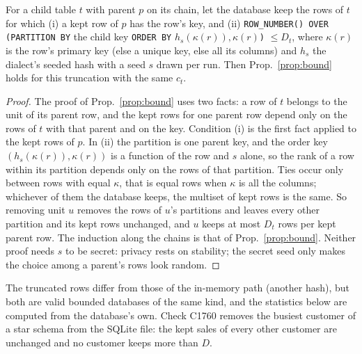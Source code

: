 \setcounter{proposition}{1759}
\begin{proposition}\label{prop:sqlbound}
For a child table $t$ with parent $p$ on its chain, let the database keep the rows of $t$ for which (i) a kept row of $p$ has the row's key, and (ii) \texttt{ROW\_NUMBER() OVER (PARTITION BY} the child key \texttt{ORDER BY} $h_s(\kappa(r)),\kappa(r)$\texttt{)} $\le D_t$, where $\kappa(r)$ is the row's primary key (else a unique key, else all its columns) and $h_s$ the dialect's seeded hash with a seed $s$ drawn per run. Then Prop.~\ref{prop:bound} holds for this truncation with the same $c_t$.
\end{proposition}
\begin{proof}
The proof of Prop.~\ref{prop:bound} uses two facts: a row of $t$ belongs to the unit of its parent row, and the kept rows for one parent row depend only on the rows of $t$ with that parent and on the key. Condition (i) is the first fact applied to the kept rows of $p$. In (ii) the partition is one parent key, and the order key $(h_s(\kappa(r)),\kappa(r))$ is a function of the row and $s$ alone, so the rank of a row within its partition depends only on the rows of that partition. Ties occur only between rows with equal $\kappa$, that is equal rows when $\kappa$ is all the columns; whichever of them the database keeps, the multiset of kept rows is the same. So removing unit $u$ removes the rows of $u$'s partitions and leaves every other partition and its kept rows unchanged, and $u$ keeps at most $D_t$ rows per kept parent row. The induction along the chains is that of Prop.~\ref{prop:bound}. Neither proof needs $s$ to be secret: privacy rests on stability; the secret seed only makes the choice among a parent's rows look random.
\end{proof}
\noindent The truncated rows differ from those of the in-memory path (another hash), but both are valid bounded databases of the same kind, and the statistics below are computed from the database's own. Check C1760 removes the busiest customer of a star schema from the SQLite file: the kept sales of every other customer are unchanged and no customer keeps more than $D$.

